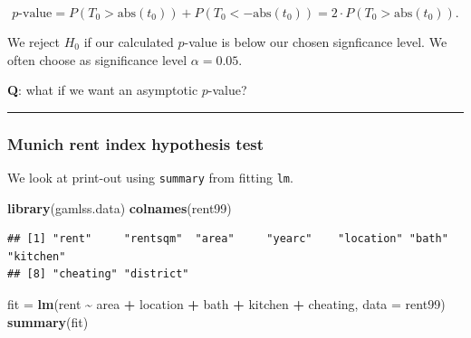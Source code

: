 \documentclass[
]{article}
\newenvironment{Shaded}{\begin{snugshade}}{\end{snugshade}}
\newcommand{\AttributeTok}[1]{\textcolor[rgb]{0.13,0.29,0.53}{#1}}
\newcommand{\FunctionTok}[1]{\textcolor[rgb]{0.13,0.29,0.53}{\textbf{#1}}}
\newcommand{\NormalTok}[1]{#1}
\newcommand{\OtherTok}[1]{\textcolor[rgb]{0.56,0.35,0.01}{#1}}
\newcommand{\SpecialCharTok}[1]{\textcolor[rgb]{0.81,0.36,0.00}{\textbf{#1}}}
\begin{document}
\[p\text{-value}=P(T_0>\text{abs}(t_0))+P(T_0<-\text{abs}(t_0))=2\cdot P(T_0>\text{abs}(t_0)).\]

We reject \(H_0\) if our calculated \(p\)-value is below our chosen
signficance level. We often choose as significance level
\(\alpha=0.05\).

\textbf{Q}: what if we want an asymptotic \(p\)-value?

\begin{center}\rule{0.5\linewidth}{0.5pt}\end{center}

\hypertarget{munich-rent-index-hypothesis-test}{%
\subsubsection{Munich rent index hypothesis
test}\label{munich-rent-index-hypothesis-test}}

We look at print-out using \texttt{summary} from fitting \texttt{lm}.

\footnotesize

\begin{Shaded}
\begin{Highlighting}[]
\FunctionTok{library}\NormalTok{(gamlss.data)}
\FunctionTok{colnames}\NormalTok{(rent99)}
\end{Highlighting}
\end{Shaded}

\begin{verbatim}
## [1] "rent"     "rentsqm"  "area"     "yearc"    "location" "bath"     "kitchen" 
## [8] "cheating" "district"
\end{verbatim}

\begin{Shaded}
\begin{Highlighting}[]
\NormalTok{fit }\OtherTok{=} \FunctionTok{lm}\NormalTok{(rent }\SpecialCharTok{\textasciitilde{}}\NormalTok{ area }\SpecialCharTok{+}\NormalTok{ location }\SpecialCharTok{+}\NormalTok{ bath }\SpecialCharTok{+}\NormalTok{ kitchen }\SpecialCharTok{+}\NormalTok{ cheating, }\AttributeTok{data =}\NormalTok{ rent99)}
\FunctionTok{summary}\NormalTok{(fit)}
\end{Highlighting}
\end{Shaded}
\end{document}
